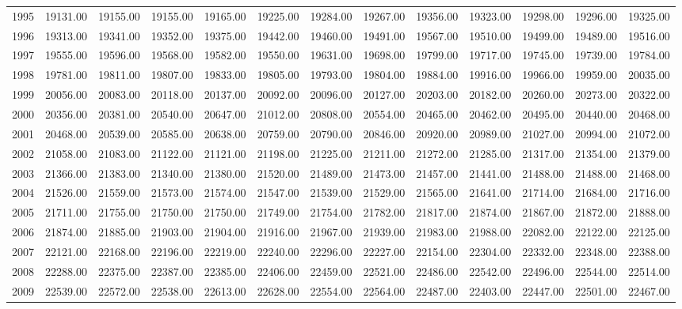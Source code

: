 \begin{longtable}{rrrrrrrrrrrrr}
  1995 & 19131.00 & 19155.00 & 19155.00 & 19165.00 & 19225.00 & 19284.00 & 19267.00 & 19356.00 & 19323.00 & 19298.00 & 19296.00 & 19325.00 \\ 
  1996 & 19313.00 & 19341.00 & 19352.00 & 19375.00 & 19442.00 & 19460.00 & 19491.00 & 19567.00 & 19510.00 & 19499.00 & 19489.00 & 19516.00 \\ 
  1997 & 19555.00 & 19596.00 & 19568.00 & 19582.00 & 19550.00 & 19631.00 & 19698.00 & 19799.00 & 19717.00 & 19745.00 & 19739.00 & 19784.00 \\ 
  1998 & 19781.00 & 19811.00 & 19807.00 & 19833.00 & 19805.00 & 19793.00 & 19804.00 & 19884.00 & 19916.00 & 19966.00 & 19959.00 & 20035.00 \\ 
  1999 & 20056.00 & 20083.00 & 20118.00 & 20137.00 & 20092.00 & 20096.00 & 20127.00 & 20203.00 & 20182.00 & 20260.00 & 20273.00 & 20322.00 \\ 
  2000 & 20356.00 & 20381.00 & 20540.00 & 20647.00 & 21012.00 & 20808.00 & 20554.00 & 20465.00 & 20462.00 & 20495.00 & 20440.00 & 20468.00 \\ 
  2001 & 20468.00 & 20539.00 & 20585.00 & 20638.00 & 20759.00 & 20790.00 & 20846.00 & 20920.00 & 20989.00 & 21027.00 & 20994.00 & 21072.00 \\ 
  2002 & 21058.00 & 21083.00 & 21122.00 & 21121.00 & 21198.00 & 21225.00 & 21211.00 & 21272.00 & 21285.00 & 21317.00 & 21354.00 & 21379.00 \\ 
  2003 & 21366.00 & 21383.00 & 21340.00 & 21380.00 & 21520.00 & 21489.00 & 21473.00 & 21457.00 & 21441.00 & 21488.00 & 21488.00 & 21468.00 \\ 
  2004 & 21526.00 & 21559.00 & 21573.00 & 21574.00 & 21547.00 & 21539.00 & 21529.00 & 21565.00 & 21641.00 & 21714.00 & 21684.00 & 21716.00 \\ 
  2005 & 21711.00 & 21755.00 & 21750.00 & 21750.00 & 21749.00 & 21754.00 & 21782.00 & 21817.00 & 21874.00 & 21867.00 & 21872.00 & 21888.00 \\ 
  2006 & 21874.00 & 21885.00 & 21903.00 & 21904.00 & 21916.00 & 21967.00 & 21939.00 & 21983.00 & 21988.00 & 22082.00 & 22122.00 & 22125.00 \\ 
  2007 & 22121.00 & 22168.00 & 22196.00 & 22219.00 & 22240.00 & 22296.00 & 22227.00 & 22154.00 & 22304.00 & 22332.00 & 22348.00 & 22388.00 \\ 
  2008 & 22288.00 & 22375.00 & 22387.00 & 22385.00 & 22406.00 & 22459.00 & 22521.00 & 22486.00 & 22542.00 & 22496.00 & 22544.00 & 22514.00 \\ 
  2009 & 22539.00 & 22572.00 & 22538.00 & 22613.00 & 22628.00 & 22554.00 & 22564.00 & 22487.00 & 22403.00 & 22447.00 & 22501.00 & 22467.00 \\ 

\end{longtable}
